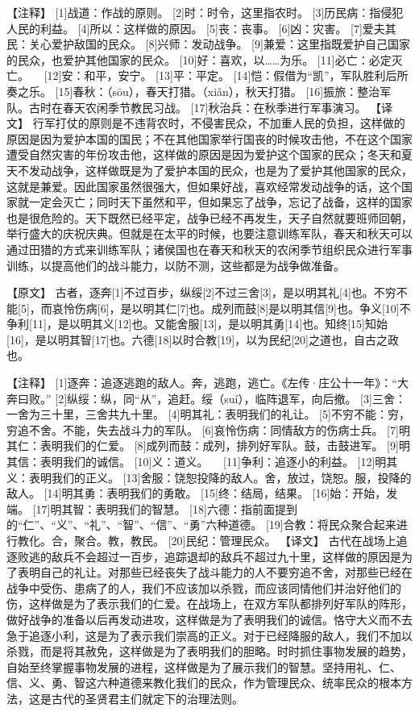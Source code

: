 \documentclass[a4paper,12pt,UTF8,twoside]{ctexbook}
\begin{document}
【注释】
[1]战道：作战的原则。
[2]时：时令，这里指农时。
[3]历民病：指侵犯人民的利益。
[4]所以：这样做的原因。
[5]丧：丧事。
[6]凶：灾害。
[7]爱夫其民：关心爱护敌国的民众。
[8]兴师：发动战争。
[9]兼爱：这里指既爱护自己国家的民众，也爱护其他国家的民众。
[10]好：喜欢，以……为乐。
[11]必亡：必定灭亡。
　[12]安：和平，安宁。
[13]平：平定。
[14]恺：假借为“凯”，军队胜利后所奏之乐。
[15]春秋：（sōu），春天打猎。（xiǎn），秋天打猎。
[16]振旅：整治军队。古时在春天农闲季节教民习战。
[17]秋治兵：在秋季进行军事演习。
【译文】
行军打仗的原则是不违背农时，不侵害民众，不加重人民的负担，这样做的原因是因为爱护本国的国民；不在其他国家举行国丧的时候攻击他，不在这个国家遭受自然灾害的年份攻击他，这样做的原因是因为爱护这个国家的民众；冬天和夏天不发动战争，这样做既是为了爱护本国的民众，也是为了爱护其他国家的民众，这就是兼爱。因此国家虽然很强大，但如果好战，喜欢经常发动战争的话，这个国家就一定会灭亡；同时天下虽然和平，但如果忘了战争，忘记了战备，这样的国家也是很危险的。天下既然已经平定，战争已经不再发生，天子自然就要班师回朝，举行盛大的庆祝庆典。但就是在太平的时候，也要注意训练军队，春天和秋天可以通过田猎的方式来训练军队；诸侯国也在春天和秋天的农闲季节组织民众进行军事训练，以提高他们的战斗能力，以防不测，这些都是为战争做准备。

【原文】
古者，逐奔[1]不过百步，纵绥[2]不过三舍[3]，是以明其礼[4]也。不穷不能[5]，而哀怜伤病[6]，是以明其仁[7]也。成列而鼓[8]是以明其信[9]也。争义[10]不争利[11]，是以明其义[12]也。又能舍服[13]，是以明其勇[14]也。知终[15]知始[16]，是以明其智[17]也。六德[18]以时合教[19]，以为民纪[20]之道也，自古之政也。

【注释】
[1]逐奔：追逐逃跑的敌人。奔，逃跑，逃亡。《左传·庄公十一年》：“大奔曰败。”
[2]纵绥：纵，同“从”，追赶。绥（suí），临阵退军，向后撤。
[3]三舍：一舍为三十里，三舍共九十里。
[4]明其礼：表明我们的礼让。
[5]不穷不能：穷，穷追不舍。不能，失去战斗力的军队。
[6]哀怜伤病：同情敌方的伤病士兵。
[7]明其仁：表明我们的仁爱。
[8]成列而鼓：成列，排列好军队。鼓，击鼓进军。
[9]明其信：表明我们的诚信。
[10]义：道义。
　[11]争利：追逐小的利益。
[12]明其义：表明我们的正义。
[13]舍服：饶恕投降的敌人。舍，放过，饶恕。服，投降的敌人。
[14]明其勇：表明我们的勇敢。
[15]终：结局，结果。
[16]始：开始，发端。
[17]明其智：表明我们的智慧。
[18]六德：指前面提到的“仁”、“义”、“礼”、“智”、“信”、“勇”六种道德。
[19]合教：将民众聚合起来进行教化。合，聚合。教，教民。
[20]民纪：管理民众。
【译文】
古代在战场上追逐败逃的敌兵不会超过一百步，追踪退却的敌兵不超过九十里，这样做的原因是为了表明自己的礼让。对那些已经丧失了战斗能力的人不要穷追不舍，对那些已经在战争中受伤、患病了的人，我们不应该加以杀戮，而应该同情他们并治好他们的伤，这样做是为了表示我们的仁爱。在战场上，在双方军队都排列好军队的阵形，做好战争的准备以后再发动进攻，这样做是为了表明我们的诚信。恪守大义而不去急于追逐小利，这是为了表示我们崇高的正义。对于已经降服的敌人，我们不加以杀戮，而是将其赦免，这样做是为了表明我们的胆略。时时抓住事物发展的趋势，自始至终掌握事物发展的进程，这样做是为了展示我们的智慧。坚持用礼、仁、信、义、勇、智这六种道德来教化我们的民众，作为管理民众、统率民众的根本方法，这是古代的圣贤君主们就定下的治理法则。
\end{document}
